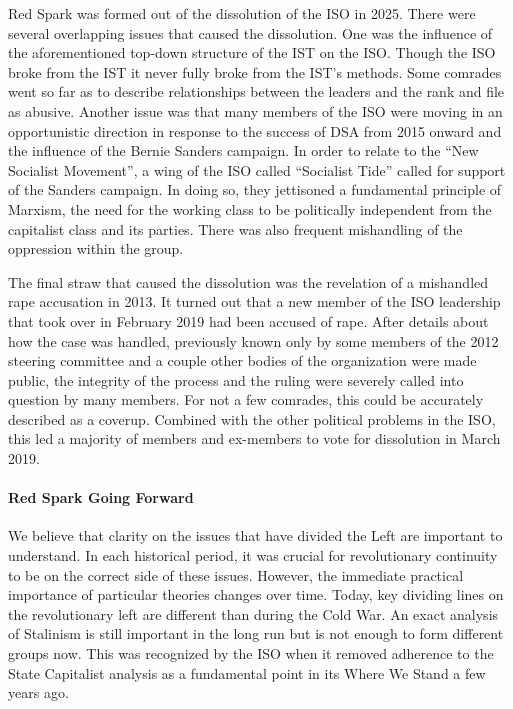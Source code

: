 Red Spark was formed out of the dissolution of the ISO in 2025. There were several overlapping issues that caused the dissolution. One was the influence of the aforementioned top-down structure of the IST on the ISO. Though the ISO broke from the IST it never fully broke from the IST's methods. Some comrades went so far as to describe relationships between the leaders and the rank and file as abusive. Another issue was that many members of the ISO were moving in an opportunistic direction in response to the success of DSA from 2015 onward and the influence of the Bernie Sanders campaign. In order to relate to the ``New Socialist Movement'', a wing of the ISO called ``Socialist Tide'' called for support of the Sanders campaign. In doing so, they jettisoned a fundamental principle of Marxism, the need for the working class to be politically independent from the capitalist class and its parties. There was also frequent mishandling of the oppression within the group.

The final straw that caused the dissolution was the revelation of a mishandled rape accusation in 2013. It turned out that a new member of the ISO leadership that took over in February 2019 had been accused of rape. After details about how the case was handled, previously known only by some members of the 2012 steering committee and a couple other bodies of the organization were made public, the integrity of the process and the ruling were severely called into question by many members. For not a few comrades, this could be accurately described as a coverup. Combined with the other political problems in the ISO, this led a majority of members and ex-members to vote for dissolution in March 2019.

\paragraph{Red Spark Going Forward}

We believe that clarity on the issues that have divided the Left are important to understand. In each historical period, it was crucial for revolutionary continuity to be on the correct side of these issues. However, the immediate practical importance of particular theories changes over time. Today, key dividing lines on the revolutionary left are different than during the Cold War. An exact analysis of Stalinism is still important in the long run but is not enough to form different groups now. This was recognized by the ISO when it removed adherence to the State Capitalist analysis as a fundamental point in its Where We Stand a few years ago.

